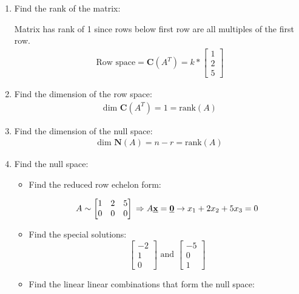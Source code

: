 \documentclass[10pt,a4paper]{article}
\begin{document}
\begin{enumerate}
	\item Find the rank of the matrix:
	
	Matrix has rank of 1 since rows below first row are all multiples of the first row.
	\begin{align*}
		\text{Row space} = \textbf{C}(A^T)=k*
		\begin{bmatrix}
			1 \\
			2 \\
			5
		\end{bmatrix}
	\end{align*}
	\item Find the dimension of the row space: 
	\begin{align*}
		\text{dim }\textbf{C}(A^T) = 1 = \text{rank}(A)
	\end{align*}
	\item Find the dimension of the null space:  
	\begin{align*}
		\text{dim }\textbf{N}(A) = n-r = \text{rank}(A)
	\end{align*}
	\item Find the null space:
	\begin{itemize}
		\item Find the reduced row echelon form:
		\begin{ceqn}
		\begin{equation*}
			A \sim 
			\begin{bmatrix}
				1 & 2 & 5 \\
				0 & 0 & 0
			\end{bmatrix} \\
			\Rightarrow A\textbf{\underbar{x}}=\textbf{\underbar{0}} \rightarrow x_1 + 2x_2 + 5x_3 = 0
		\end{equation*}
		\end{ceqn}
		\item Find the special solutions:
		\begin{equation*} 
			\begin{bmatrix}
				-2 \\
				1 \\
				0
				\end{bmatrix} \textrm{ and } \begin{bmatrix}
					-5 \\
					0 \\
					1
					\end{bmatrix}
		\end{equation*}
		\item Find the linear linear combinations that form the null space:

\end{itemize}
\end{enumerate}
\end{document}

